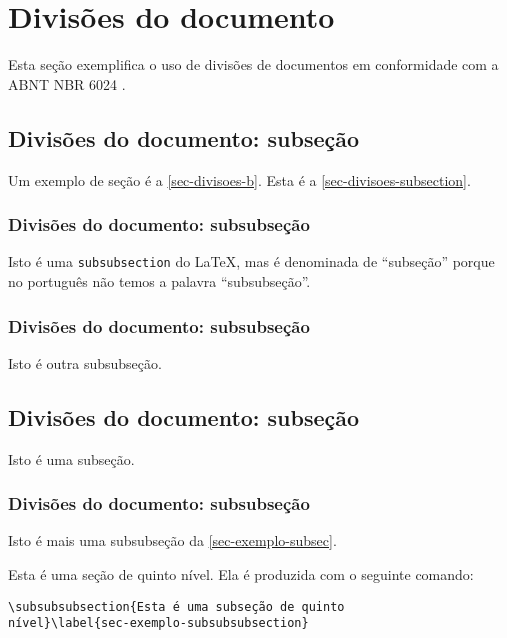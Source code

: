 \section{Divisões do documento}\label{sec-divisoes-b}
Esta seção exemplifica o uso de divisões de documentos em conformidade com a ABNT NBR 6024  \cite{nbr6024}.
\subsection{Divisões do documento: subseção}\label{sec-divisoes-subsection}

Um exemplo de seção é a \autoref{sec-divisoes-b}. Esta é a \autoref{sec-divisoes-subsection}.

\subsubsection{Divisões do documento: subsubseção}\label{sec-divisoes-subsubsection}

Isto é uma \texttt{subsubsection} do \LaTeX, mas é denominada de ``subseção'' porque no português não temos a palavra ``subsubseção''.

\subsubsection{Divisões do documento: subsubseção}

Isto é outra subsubseção.

\subsection{Divisões do documento: subseção}\label{sec-exemplo-subsec}

Isto é uma subseção.

\subsubsection{Divisões do documento: subsubseção}

Isto é mais uma subsubseção da \autoref{sec-exemplo-subsec}.


\label{sec-exemplo-subsubsubsection}

Esta é uma seção de quinto nível. Ela é produzida com o seguinte comando:

\begin{verbatim}
\subsubsubsection{Esta é uma subseção de quinto
nível}\label{sec-exemplo-subsubsubsection}
\end{verbatim}

